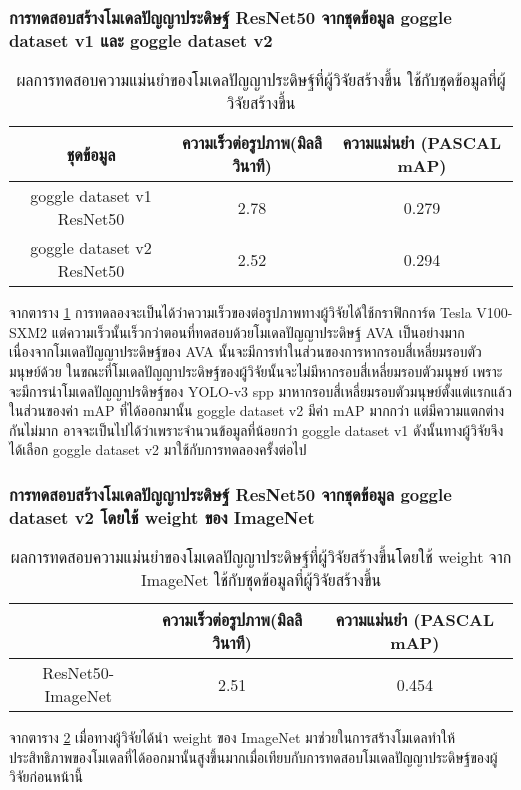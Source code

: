 \subsubsection{การทดสอบสร้างโมเดลปัญญาประดิษฐ์ ResNet50 จากชุดข้อมูล goggle dataset v1 และ goggle dataset v2}
\begin{table}[!ht]
	\centering
	\begin{tabular}{|c|c|c|}
			\hline
			{ชุดข้อมูล}&{ความเร็วต่อรูปภาพ(มิลลิวินาที)}&{ความแม่นยำ (PASCAL mAP)}			\\
			\hline
			goggle dataset v1 ResNet50			& 2.78			& 0.279				\\
			goggle dataset v2 ResNet50			& 2.52			& 0.294				\\
			\hline
	\end{tabular}
\caption{ผลการทดสอบความแม่นยำของโมเดลปัญญาประดิษฐ์ที่ผู้วิจัยสร้างขึ้น ใช้กับชุดข้อมูลที่ผู้วิจัยสร้างขึ้น}
\label{tab: Test PASCAL mAP of dataset created by the researcher}
\end{table}
จากตาราง \ref{tab: Test PASCAL mAP of dataset created by the researcher} การทดลองจะเป็นได้ว่าความเร็วของต่อรูปภาพทางผู้วิจัยได้ใช้กราฟิกการ์ด Tesla V100-SXM2 แต่ความเร็วนั้นเร็วกว่าตอนที่ทดสอบด้วยโมเดลปัญญาประดิษฐ์ AVA เป็นอย่างมาก เนื่องจากโมเดลปัญญาประดิษฐ์ของ AVA นั้นจะมีการทำในส่วนของการหากรอบสี่เหลี่ยมรอบตัวมนุษย์ด้วย ในขณะที่โมเดลปัญญาประดิษฐ์ของผู้วิจัยนั้นจะไม่มีหากรอบสี่เหลี่ยมรอบตัวมนุษย์ เพราะจะมีการนำโมเดลปัญญาปรดิษฐ์ของ YOLO-v3 spp มาหากรอบสี่เหลี่ยมรอบตัวมนุษย์ตั้งแต่แรกแล้ว ในส่วนของค่า mAP ที่ได้ออกมานั้น goggle dataset v2 มีค่า mAP มากกว่า แต่มีความแตกต่างกันไม่มาก อาจจะเป็นไปได้ว่าเพราะจำนวนข้อมูลที่น้อยกว่า goggle dataset v1 ดังนั้นทางผู้วิจัยจึงได้เลือก goggle dataset v2 มาใช้กับการทดลองครั้งต่อไป
\clearpage
\subsubsection{การทดสอบสร้างโมเดลปัญญาประดิษฐ์ ResNet50 จากชุดข้อมูล goggle dataset v2 โดยใช้ weight ของ ImageNet}
\begin{table}[!ht]
	\centering
	\begin{tabular}{|c|c|c|}
			\hline
			{}&{ความเร็วต่อรูปภาพ(มิลลิวินาที)}&{ความแม่นยำ (PASCAL mAP)}			\\
			\hline
			ResNet50-ImageNet			& 2.51			& 0.454				\\
			\hline
	\end{tabular}
\caption{ผลการทดสอบความแม่นยำของโมเดลปัญญาประดิษฐ์ที่ผู้วิจัยสร้างขึ้นโดยใช้ weight จาก ImageNet ใช้กับชุดข้อมูลที่ผู้วิจัยสร้างขึ้น}
\label{tab: Test PASCAL mAP of dataset created by the researcher and pretrain weight imagenet}
\end{table}
จากตาราง \ref{tab: Test PASCAL mAP of dataset created by the researcher and pretrain weight imagenet} เมื่อทางผู้วิจัยได้นำ weight ของ ImageNet มาช่วยในการสร้างโมเดลทำให้ประสิทธิภาพของโมเดลที่ได้ออกมานั้นสูงขึ้นมากเมื่อเทียบกับการทดสอบโมเดลปัญญาประดิษฐ์ของผู้วิจัยก่อนหน้านี้

